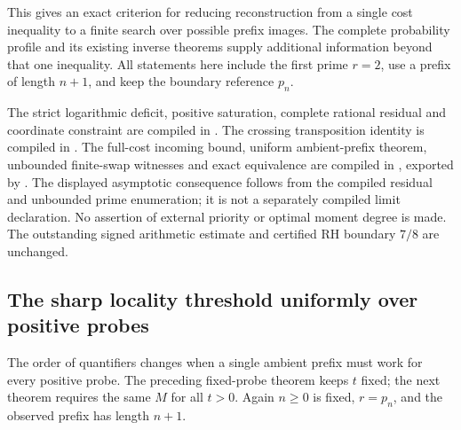 \documentclass[11pt]{article}
\theoremstyle{definition}
\begin{document}
This gives an exact criterion for reducing reconstruction from a
single cost inequality to a finite search over possible prefix
images. The complete probability profile and its existing inverse
theorems supply additional information beyond that one inequality.
All statements here include the first prime $r=2$, use a prefix of
length $n+1$, and keep the boundary reference $p_n$.

\begin{flushleft}
The strict logarithmic deficit, positive saturation, complete
rational residual and coordinate constraint are compiled in
.
The crossing transposition identity is compiled in
.
The full-cost incoming bound, uniform ambient-prefix theorem,
unbounded finite-swap witnesses and exact equivalence are compiled in
, exported by
.
The displayed asymptotic consequence follows from the compiled
residual and unbounded prime enumeration; it is not a separately
compiled limit declaration. No assertion of external priority or
optimal moment degree is made. The outstanding signed arithmetic
estimate and certified RH boundary $7/8$ are unchanged.
\end{flushleft}

\clearpage
\subsection{The sharp locality threshold uniformly over positive probes}

The order of quantifiers changes when a single ambient prefix must
work for every positive probe. The preceding fixed-probe theorem
keeps $t$ fixed; the next theorem requires the same $M$ for all
$t>0$. Again $n\ge0$ is fixed, $r=p_n$, and the observed prefix
has length $n+1$.
\end{document}
